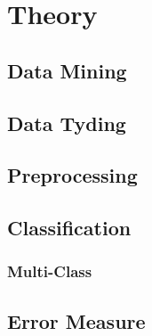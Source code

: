 \chapter{Theory}
\label{chap:Theory}

\section{Data Mining}
\label{sec:Data Mining}

\section{Data Tyding}
\label{sec:Data Tyding}

\section{Preprocessing}
\label{sec:Preprocessing}

\section{Classification}
\label{sec:Classification}

\subsection{Multi-Class}
\label{sub:Multi-Class}

\section{Error Measure}
\label{sec:Error Measure}
